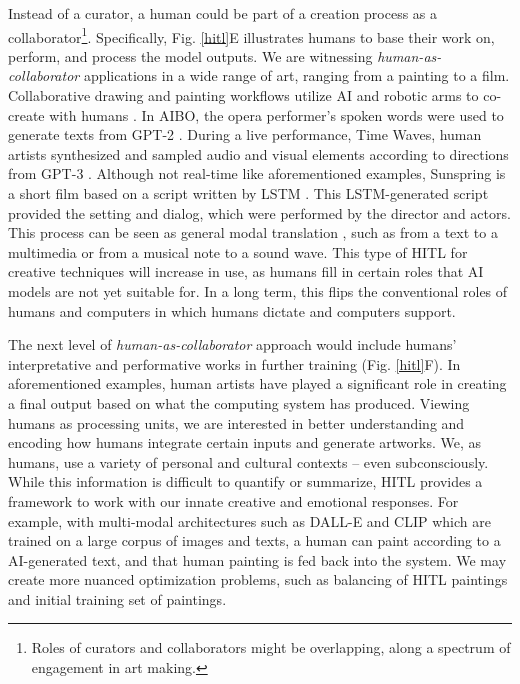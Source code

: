 \documentclass[letterpaper]{article} %
\begin{document}
Instead of a curator, a human could be part of a creation process as a collaborator\footnote{Roles of curators and collaborators might be overlapping, along a spectrum of engagement in art making.}. Specifically, Fig. \ref{hitl}E illustrates humans to base their work on, perform, and process the model outputs. We are witnessing \emph{human-as-collaborator} applications in a wide range of art, ranging from a painting to a film. Collaborative drawing and painting workflows utilize AI and robotic arms to co-create with humans \cite{Jansen2021}. In AIBO, the opera performer's spoken words were used to generate texts from GPT-2 \cite{Pearlman2021}. During a live performance, Time Waves, human artists synthesized and sampled audio and visual elements according to directions from GPT-3 \cite{TimeWaves}. Although not real-time like aforementioned examples, Sunspring \cite{Sunspring} is a short film based on a script written by LSTM \cite{Hochreiter1997}. This LSTM-generated script provided the setting and dialog, which were performed by the director and actors. This process can be seen as general modal translation \cite{Specia2016}, such as from a text to a multimedia or from a musical note to a sound wave. This type of HITL for creative techniques will increase in use, as humans fill in certain roles that AI models are not yet suitable for. In a long term, this flips the conventional roles of humans and computers in which humans dictate and computers support.

The next level of \emph{human-as-collaborator} approach would include humans' interpretative and performative works in further training (Fig. \ref{hitl}F). In aforementioned examples, human artists have played a significant role in creating a final output based on what the computing system has produced. Viewing humans as processing units, we are interested in better understanding and encoding how humans integrate certain inputs and generate artworks. We, as humans, use a variety of personal and cultural contexts -- even subconsciously. While this information is difficult to quantify or summarize, HITL provides a framework to work with our innate creative and emotional responses. For example, with multi-modal architectures such as DALL-E \cite{Ramesh2021} and CLIP \cite{Radford2021} which are trained on a large corpus of images and texts, a human can paint according to a AI-generated text, and that human painting is fed back into the system. We may create more nuanced optimization problems, such as balancing of HITL paintings and initial training set of paintings.
\end{document}
